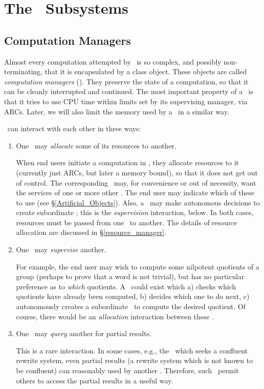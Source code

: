 \section{The \SM\ Subsystems}

\subsection{Computation Managers}\label{computation_managers}

Almost every computation attempted by \magnus\ is so complex, and
possibly non-terminating, that it is encapsulated by a class object.
These objects are called {\em computation managers} (\CMs). They
preserve the state of a computation, so that it can be cleanly
interrupted and continued. The most important property of a
\CM\ is that it tries to use CPU time within limits set
by its supervising manager, via ARCs.  Later, we will also limit the
memory used by a \CM\ in a similar way.

\CMs\ can interact with each other in three ways:

\begin{enumerate}

\item
One \CM\ may {\em allocate} some of its resources to another.

When end users initiate a computation in \magnus, they allocate
resources to it (currently just ARCs, but later a memory bound), so
that it does not get out of control. The corresponding \CM\ may, for
convenience or out of necessity, want the services of one or more
other \CMs. The end user may indicate which of these to use (see
\S\ref{Artificial_Objects}). Also, a \CM\ may make autonomous decisions
to create subordinate \CMs; this is the {\em supervision} interaction,
below. In both cases, resources must be passed from one \CM\ to
another. The details of resource allocation are discussed in
\S\ref{resource_manager}.

\item
One \CM\ may {\em supervise} another.

For example, the end user may wish to compute some nilpotent quotients
of a group (perhaps to prove that a word is not trivial), but has no
particular preference as to {\em which} quotients. A \CM\ could exist
which a) checks which quotients have already been computed, b) decides
which one to do next, c) autonomously creates a subordinate \CM\ to
compute the desired quotient. Of course, there would be an {\em
allocation} interaction between these \CMs.

\item
One \CM\ may {\em query} another for partial results.

This is a rare interaction. In some cases, e.g., the \CM\ which seeks
a confluent rewrite system, even partial results (a rewrite system
which is not known to be confluent) can reasonably used by another
\CM. Therefore, such \CMs\ permit others to access the partial
results in a useful way.

\end{enumerate}


